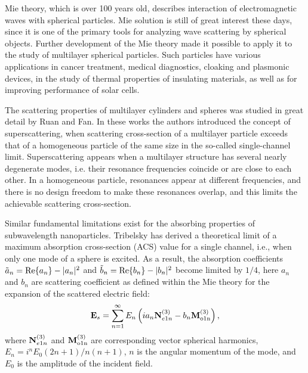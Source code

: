 \documentclass[twoside,twocolumn,9pt]{article}
\begin{document}

\rmfamily %


Mie theory,\cite{Mie-1908} which is over 100 years old, describes
interaction of electromagnetic waves with spherical particles. Mie
solution is still of great interest these
days,\cite{Suzuki-2008,MacKowski-2012,Lerme-2000,Xu-2005,Li-2006,Gogoi-2010,Santiago-2011}
since it is one of the primary tools for analyzing wave scattering by
spherical objects. Further development of the Mie
theory\cite{Yang-2003, Pena-scattnlay-2009} made it possible to apply
it to the study of multilayer spherical
particles.\cite{Sheehan-2013,Selmke-2012}  Such particles have
various applications in cancer treatment,\cite{Zhang-2010,
  Hirsch-2003} medical diagnostics,\cite{Allain-2002}
cloaking\cite{Qui-2009, Semouchkina-2013, Ladutenko-2014} and
plasmonic devices,\cite{Liu-MatLett-2015, Martin-2013, Alu-2005, Liu-Nanotech-2013} in the study of
thermal properties of insulating materials,\cite{Xie-2013} as well as
for improving performance of solar cells.\cite{Kameya-2011,Mann-2011}

The scattering properties of multilayer cylinders and spheres was
studied in great detail by Ruan and Fan.\cite{Fan-2010,Fan-2011}  In
these works the authors introduced the concept of superscattering,
when scattering cross-section of a multilayer particle exceeds that of
a homogeneous particle of the same size in the so-called
single-channel limit. Superscattering appears when a multilayer
structure has several nearly degenerate modes, i.e. their resonance
frequencies coincide or are close to each other. In a homogeneous
particle, resonances appear at different frequencies, and there is no
design freedom to make these resonances overlap, and this limits the
achievable scattering cross-section.

Similar fundamental limitations exist for the absorbing properties of
subwavelength nanoparticles.  Tribelsky\cite{Tribelsky-2011} has
derived a theoretical limit of a maximum absorption cross-section
(ACS) value for a single channel, i.e., when only one mode of a sphere
is excited.  As a result, the absorption coefficients $\tilde{a}_n=
{\rm Re}\{a_n\} - |a_n|^2 $ and $\tilde{b}_n= {\rm Re}\{b_n\} -
|b_n|^2 $ become limited by $1/4$, here $a_n$ and $b_n$ are scattering
coefficient as defined within the Mie theory\cite{Bohren-1983} for the
expansion of the scattered electric field:
\[
{\rm \mathbf{E}}_s = \sum_{n=1}^{\infty} E_n \left( i a_n {\rm
    \mathbf{N}}_{e1n}^{(3)} - b_n{\rm\mathbf{M}_{o1n}^{(3)}} \right),
\]
where ${\rm \mathbf{N}}_{e1n}^{(3)}$ and ${\rm\mathbf{M}_{o1n}^{(3)}}$
are corresponding vector spherical harmonics,
$E_n=i^nE_0(2n+1)/n(n+1)$, $n$ is the angular momentum of the mode,
and $E_0$ is the amplitude of the incident field.
\end{document}
